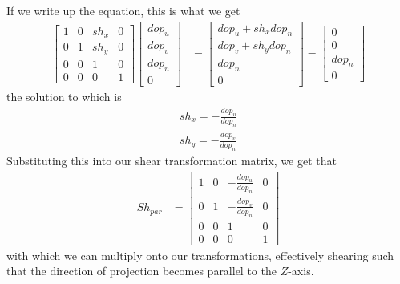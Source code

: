 \documentclass[11pt]{article}
\begin{document}
If we write up the equation, this is what we get
\begin{align}
    \begin{bmatrix}
        1 & 0 & sh_x & 0 \\
        0 & 1 & sh_y & 0 \\
        0 & 0 & 1 & 0 \\
        0 & 0 & 0 & 1
    \end{bmatrix}
    \begin{bmatrix}
        dop_u \\
        dop_v \\
        dop_n \\
        0
    \end{bmatrix}
    &=
    \begin{bmatrix}
        dop_u + sh_x dop_n \\
        dop_v + sh_y dop_n \\
        dop_n \\
        0
    \end{bmatrix}
    =
    \begin{bmatrix}
        0 \\
        0 \\
        dop_n \\
        0
    \end{bmatrix}
\end{align}
the solution to which is
\begin{align}
    sh_x = -\frac{dop_u}{dop_n} \\
    sh_y = -\frac{dop_v}{dop_n}
\end{align}
Substituting this into our shear transformation matrix, we get that
\begin{align}
    Sh_{par} &=
    \begin{bmatrix}
        1 & 0 & -\frac{dop_u}{dop_n} & 0 \\
        0 & 1 & -\frac{dop_v}{dop_n} & 0 \\
        0 & 0 & 1 & 0 \\
        0 & 0 & 0 & 1
    \end{bmatrix}
\end{align}
with which we can multiply onto our transformations, effectively shearing such
that the direction of projection becomes parallel to the $Z$-axis.
\end{document}
